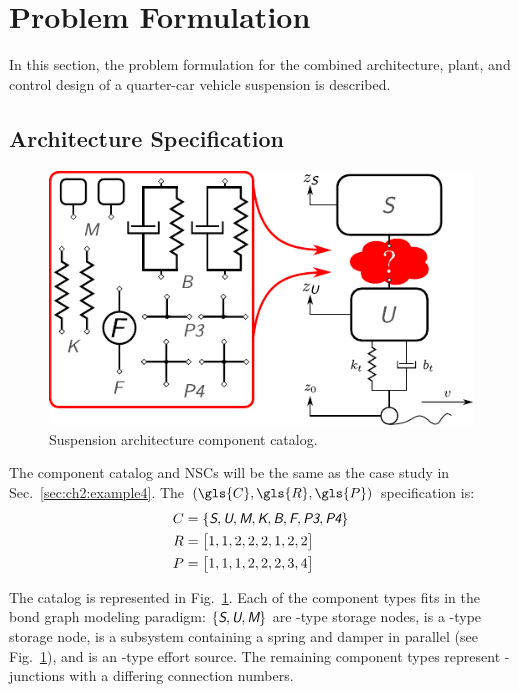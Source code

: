 \section{Problem Formulation\label{sec:ch8:formulation}}

In this section, the problem formulation for the combined architecture, plant, and control design of a quarter-car vehicle suspension is described.

\subsection{Architecture Specification}

\begin{figure}
\centering
\includegraphics[width=0.55\columnwidth]{../ch8/figures/suspension1}
\caption{Suspension architecture component catalog.\label{fig:ch8:suspension1}}
\end{figure}

The component catalog and NSCs will be the same as the case study in Sec.~\ref{sec:ch2:example4}.
The $(\gls{C}, \gls{R}, \gls{P})$ specification is:
\begin{subequations}
\label{eq:ch8:CRP}
\begin{align}
C &= \{\textsl{\textsf{S}}, \textsl{\textsf{U}},  \textsl{\textsf{M}},  \textsl{\textsf{K}},  \textsl{\textsf{B}},  \textsl{\textsf{F}}, \textsl{\textsf{P3}}, \textsl{\textsf{P4}} \} \\
R &= \begin{bmatrix} 1,1,2,2,2,1,2,2 \end{bmatrix} \\
P &= \begin{bmatrix} 1,1,1,2,2,2,3,4 \end{bmatrix}
\end{align}
\end{subequations}

\noindent The catalog is represented in Fig.~\ref{fig:ch8:suspension1}.
Each of the component types fits in the bond graph modeling paradigm: $\{\textsl{\textsf{S}}, \textsl{\textsf{U}},  \textsl{\textsf{M}}\}$ are -type storage nodes,  is a -type storage node,  is a subsystem containing a spring and damper in parallel (see Fig.~\ref{fig:ch8:suspension1}), and  is an -type effort source.
The remaining component types represent -junctions with a differing connection numbers.

